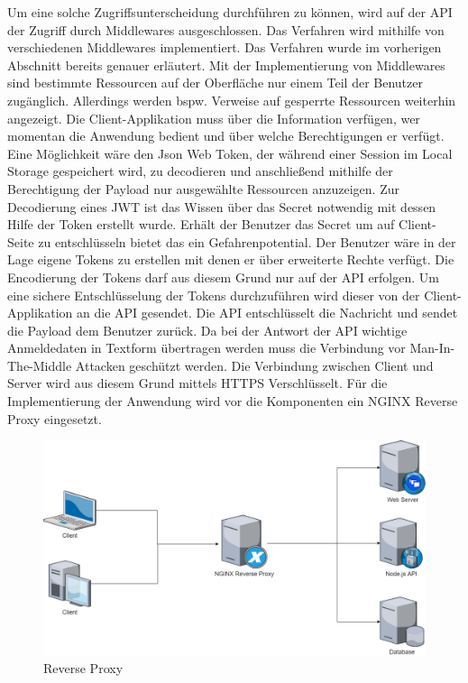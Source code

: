 \documentclass[utf8,biblatex]{lni}
\begin{document}
Um eine solche Zugriffsunterscheidung durchführen zu können, wird auf der API der Zugriff durch Middlewares ausgeschlossen. 
Das Verfahren wird mithilfe von verschiedenen Middlewares implementiert. Das Verfahren wurde im vorherigen Abschnitt 
bereits genauer erläutert. 
Mit der Implementierung von Middlewares sind bestimmte Ressourcen auf der Oberfläche nur einem Teil der Benutzer zugänglich. 
Allerdings werden bspw. Verweise auf gesperrte Ressourcen weiterhin angezeigt. 
Die Client-Applikation muss über die Information verfügen, wer momentan die Anwendung bedient und über welche Berechtigungen er verfügt. 
Eine Möglichkeit wäre den Json Web Token, der während einer Session im Local Storage gespeichert wird, zu decodieren und anschließend 
mithilfe der Berechtigung der Payload nur ausgewählte Ressourcen anzuzeigen. 
Zur Decodierung eines JWT ist das Wissen über das Secret notwendig mit dessen Hilfe der Token erstellt wurde. 
Erhält der Benutzer das Secret um auf Client-Seite zu entschlüsseln bietet das ein Gefahrenpotential. 
Der Benutzer wäre in der Lage eigene Tokens zu erstellen mit denen er über erweiterte Rechte verfügt. 
Die Encodierung der Tokens darf aus diesem Grund nur auf der API erfolgen. 
Um eine sichere Entschlüsselung der Tokens durchzuführen wird dieser von der Client-Applikation an die API 
gesendet. Die API entschlüsselt die Nachricht und sendet die Payload dem Benutzer zurück. 
Da bei der Antwort der API wichtige Anmeldedaten in Textform übertragen werden muss die Verbindung vor Man-In-The-Middle Attacken geschützt werden. 
Die Verbindung zwischen Client und Server wird aus diesem Grund mittels HTTPS Verschlüsselt. 
Für die Implementierung der Anwendung wird vor die Komponenten ein NGINX Reverse Proxy eingesetzt. 

\begin{figure}
  \centering
  \includegraphics[width=\textwidth]{images/reversep.png}
  \caption[Reverse Proxy]{Reverse Proxy} 
  \label{Reverse-proxy}
\end{figure} 
\end{document}
